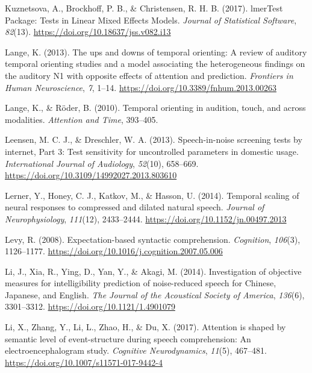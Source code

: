 \documentclass[a4paper, nobind]{templates/ociamthesis}
\newlength{\cslhangindent}
\newenvironment{CSLReferences}[2] %
 {%
  \setlength{\parindent}{0pt}
  \ifodd #1
  \let\oldpar\par
  \def\par{\hangindent=\cslhangindent\oldpar}
  \fi
  \setlength{\parskip}{1mm}
  \setlength{\baselineskip}{6mm}
 }%
 {}
\begin{document}
\begin{CSLReferences}{1}{0}
\leavevmode{}%
Kuznetsova, A., Brockhoff, P. B., \& Christensen, R. H. B. (2017). lmerTest Package: Tests in Linear Mixed Effects Models. \emph{Journal of Statistical Software}, \emph{82}(13). \url{https://doi.org/10.18637/jss.v082.i13}

\leavevmode{}%
Lange, K. (2013). {The ups and downs of temporal orienting: A review of auditory temporal orienting studies and a model associating the heterogeneous findings on the auditory N1 with opposite effects of attention and prediction}. \emph{Frontiers in Human Neuroscience}, \emph{7}, 1--14. \url{https://doi.org/10.3389/fnhum.2013.00263}

\leavevmode{}%
Lange, K., \& Röder, B. (2010). Temporal orienting in audition, touch, and across modalities. \emph{Attention and Time}, 393--405.

\leavevmode{}%
Leensen, M. C. J., \& Dreschler, W. A. (2013). {Speech-in-noise screening tests by internet, Part 3: Test sensitivity for uncontrolled parameters in domestic usage}. \emph{International Journal of Audiology}, \emph{52}(10), 658--669. \url{https://doi.org/10.3109/14992027.2013.803610}

\leavevmode{}%
Lerner, Y., Honey, C. J., Katkov, M., \& Hasson, U. (2014). {Temporal scaling of neural responses to compressed and dilated natural speech}. \emph{Journal of Neurophysiology}, \emph{111}(12), 2433--2444. \url{https://doi.org/10.1152/jn.00497.2013}

\leavevmode{}%
Levy, R. (2008). Expectation-based syntactic comprehension. \emph{Cognition}, \emph{106}(3), 1126--1177. \url{https://doi.org/10.1016/j.cognition.2007.05.006}

\leavevmode{}%
Li, J., Xia, R., Ying, D., Yan, Y., \& Akagi, M. (2014). {Investigation of objective measures for intelligibility prediction of noise-reduced speech for Chinese, Japanese, and English}. \emph{The Journal of the Acoustical Society of America}, \emph{136}(6), 3301--3312. \url{https://doi.org/10.1121/1.4901079}

\leavevmode{}%
Li, X., Zhang, Y., Li, L., Zhao, H., \& Du, X. (2017). {Attention is shaped by semantic level of event-structure during speech comprehension: An electroencephalogram study}. \emph{Cognitive Neurodynamics}, \emph{11}(5), 467--481. \url{https://doi.org/10.1007/s11571-017-9442-4}


\end{CSLReferences}
\end{document}
